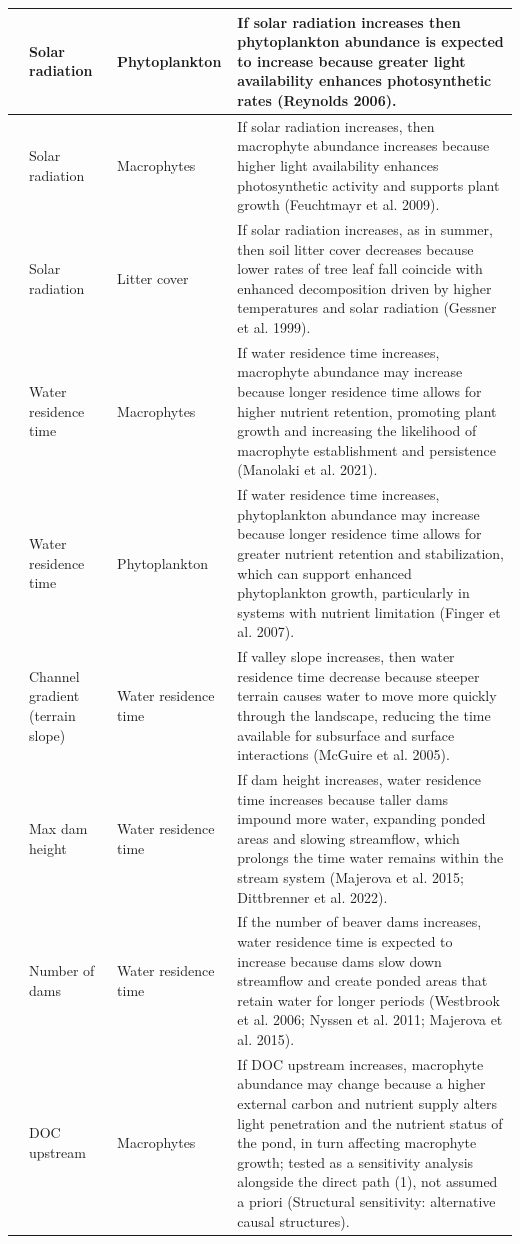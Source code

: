 \documentclass[11pt,a4paper]{article}
\begin{document}
\begin{longtable}{|>{\centering\arraybackslash}p{}|>{\raggedright\arraybackslash}p{}|>{\raggedright\arraybackslash}p{}|>{\raggedright\arraybackslash}p{}|}
6 & Solar radiation & Phytoplankton & If solar radiation increases then phytoplankton abundance is expected to increase because greater light availability enhances photosynthetic rates (Reynolds 2006). \\ \hline
7 & Solar radiation & Macrophytes & If solar radiation increases, then macrophyte abundance increases because higher light availability enhances photosynthetic activity and supports plant growth (Feuchtmayr et al. 2009). \\ \hline
8 & Solar radiation & Litter cover & If solar radiation increases, as in summer, then soil litter cover decreases because lower rates of tree leaf fall coincide with enhanced decomposition driven by higher temperatures and solar radiation (Gessner et al. 1999). \\ \hline
9 & Water residence time & Macrophytes & If water residence time increases, macrophyte abundance may increase because longer residence time allows for higher nutrient retention, promoting plant growth and increasing the likelihood of macrophyte establishment and persistence (Manolaki et al. 2021). \\ \hline
10 & Water residence time & Phytoplankton & If water residence time increases, phytoplankton abundance may increase because longer residence time allows for greater nutrient retention and stabilization, which can support enhanced phytoplankton growth, particularly in systems with nutrient limitation (Finger et al. 2007). \\ \hline
11 & Channel gradient (terrain slope) & Water residence time & If valley slope increases, then water residence time decrease because steeper terrain causes water to move more quickly through the landscape, reducing the time available for subsurface and surface interactions (McGuire et al. 2005). \\ \hline
12 & Max dam height & Water residence time & If dam height increases, water residence time increases because taller dams impound more water, expanding ponded areas and slowing streamflow, which prolongs the time water remains within the stream system (Majerova et al. 2015; Dittbrenner et al. 2022). \\ \hline
13 & Number of dams & Water residence time & If the number of beaver dams increases, water residence time is expected to increase because dams slow down streamflow and create ponded areas that retain water for longer periods (Westbrook et al. 2006; Nyssen et al. 2011; Majerova et al. 2015). \\ \hline
14 & DOC upstream & Macrophytes & If DOC upstream increases, macrophyte abundance may change because a higher external carbon and nutrient supply alters light penetration and the nutrient status of the pond, in turn affecting macrophyte growth; tested as a sensitivity analysis alongside the direct path (1), not assumed a priori (Structural sensitivity: alternative causal structures). \\ \hline

\end{longtable}
\end{document}
